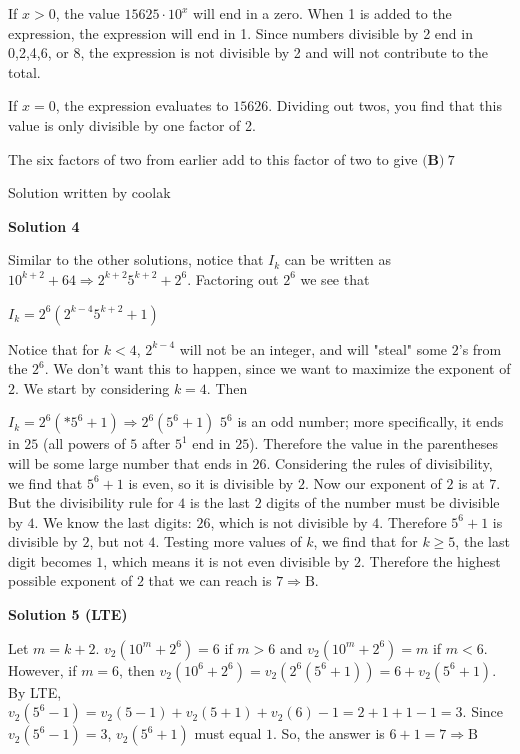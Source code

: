 \begin{enumerate}
 If $x>0$, the value $15625\cdot10^x$ will end in a zero. When 1 is added to the expression, the expression will end in 1. Since numbers divisible by 2 end in 0,2,4,6, or 8, the expression is not divisible by 2 and will not contribute to the total.

 If $x=0$, the expression evaluates to $15626$. Dividing out twos, you find that this value is only divisible by one factor of 2.

 The six factors of two from earlier add to this factor of two to give $\textbf{(B)}\ 7\qquad$

 Solution written by coolak

 


 



\textbf{Solution 4}

Similar to the other solutions, notice that $I_k$ can be written as $10^{k+2}+64 \Rightarrow 2^{k+2}5^{k+2}+2^6$. Factoring out $2^6$ we see that

 $I_k = 2^6(2^{k-4}5^{k+2}+1)$

 Notice that for $k < 4$, $2^{k-4}$ will not be an integer, and will "steal" some $2$'s from the $2^6$. We don't want this to happen, since we want to maximize the exponent of $2$. We start by considering $k = 4$. Then

 $I_k = 2^6(*5^6+1) \Rightarrow 2^6(5^6+1)$
$5^6$ is an odd number; more specifically, it ends in $25$ (all powers of $5$ after $5^1$ end in $25$). Therefore the value in the parentheses will be some large number that ends in $26$. Considering the rules of divisibility, we find that $5^6+1$ is even, so it is divisible by $2$. Now our exponent of $2$ is at $7$. But the divisibility rule for $4$ is the last $2$ digits of the number must be divisible by $4$. We know the last digits: $26$, which is not divisible by $4$. Therefore $5^6 + 1$ is divisible by $2$, but not $4$. Testing more values of $k$, we find that for $k \ge 5$, the last digit becomes $1$, which means it is not even divisible by $2$. Therefore the highest possible exponent of $2$ that we can reach is $7 \Rightarrow \boxed{\text{B}}$.

 



\textbf{Solution 5 (LTE)}

Let $m=k+2$. $v_2(10^m+2^6)=6$ if $m>6$ and $v_2(10^m+2^6)=m$ if $m<6$. However, if $m=6$, then $v_2(10^6+2^6)=v_2(2^6(5^6+1))=6+v_2(5^6+1)$. By LTE, $v_2(5^6-1)=v_2(5-1)+v_2(5+1)+v_2(6)-1=2+1+1-1=3$. Since $v_2(5^6-1)=3$, $v_2(5^6+1)$ must equal $1$. So, the answer is $6+1=7 \Rightarrow \boxed{\text{B}}$





\end{enumerate}
